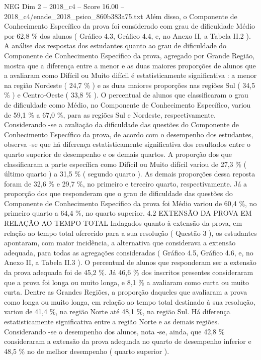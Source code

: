 \begin{textsample}{NEG Dim 2 – 2018\_c4 – Score 16.00 – 2018\_c4/enade\_2018\_psico\_860b383a75.txt}
Além disso, o Componente de Conhecimento Específico da prova foi considerado com grau de dificuldade Médio por 62,8 \% dos alunos ( Gráfico 4.3, Gráfico 4.4, e, no Anexo II, a Tabela II.2 ).
A análise das respostas dos estudantes quanto ao grau de dificuldade do Componente de Conhecimento Específico da prova, agregado por Grande Região, mostra que a diferença entre a menor e as duas maiores proporções de alunos que a avaliaram como Difícil ou Muito difícil é estatisticamente significativa : a menor na região Nordeste ( 24,7 \% ) e as duas maiores proporções nas regiões Sul ( 34,5 \% ) e Centro-Oeste ( 33,8 \% ).
O percentual de alunos que classificaram o grau de dificuldade como Médio, no Componente de Conhecimento Específico, variou de 59,1 \% a 67,0 \%, para as regiões Sul e Nordeste, respectivamente.
Considerando -se a avaliação da dificuldade das questões do Componente de Conhecimento Específico da prova, de acordo com o desempenho dos estudantes, observa -se que há diferença estatisticamente significativa dos resultados entre o quarto superior de desempenho e os demais quartos.
A proporção dos que classificaram a parte específica como Difícil ou Muito difícil variou de 27,3 \% ( último quarto ) a 31,5 \% ( segundo quarto ).
As demais proporções dessa reposta foram de 32,6 \% e 29,7 \%, no primeiro e terceiro quarto, respectivamente.
Já a proporção dos que responderam que o grau de dificuldade das questões do Componente de Conhecimento Específico da prova foi Médio variou de 60,4 \%, no primeiro quarto a 64,4 \%, no quarto superior. 4.2 EXTENSÃO DA PROVA EM RELAÇÃO AO TEMPO TOTAL Indagados quanto à extensão da prova, em relação ao tempo total oferecido para a sua resolução ( Questão 3 ), os estudantes apontaram, com maior incidência, a alternativa que considerava a extensão adequada, para todas as agregações consideradas ( Gráfico 4.5, Gráfico 4.6, e, no Anexo II, a Tabela II.3 ).
O percentual de alunos que responderam ser a extensão da prova adequada foi de 45,2 \%.
Já 46,6 \% dos inscritos presentes consideraram que a prova foi longa ou muito longa, e 8,1 \% a avaliaram como curta ou muito curta.
Dentre as Grandes Regiões, a proporção daqueles que avaliaram a prova como longa ou muito longa, em relação ao tempo total destinado à sua resolução, variou de 41,4 \%, na região Norte até 48,1 \%, na região Sul.
Há diferença estatisticamente significativa entre a região Norte e as demais regiões.
Considerando -se o desempenho dos alunos, nota -se, ainda, que 42,8 \% consideraram a extensão da prova adequada no quarto de desempenho inferior e 48,5 \% no de melhor desempenho ( quarto superior ).

\end{textsample}
